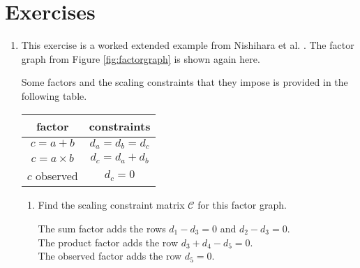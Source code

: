 

\section{Exercises}

\begin{enumerate}

\item
This exercise is a worked extended example from Nishihara et al. \cite{Nishihara:2013}. The factor graph from Figure \ref{fig:factorgraph} is shown again here.

\begin{figure}[h]
\begin{center}
\end{center}
\end{figure}

Some factors and the scaling constraints that they impose is provided in the following table.

\begin{table}[h]
\centering
\begin{tabular}{|c|c|}
\hline
factor & constraints \\
\hline
$c=a+b$ & $d_a = d_b = d_c$ \\
$c = a\times b$ & $d_c= d_a + d_b$ \\
$c$ observed & $d_c=0$ \\
\hline
\end{tabular}
\end{table}

\begin{enumerate}

\item
Find the scaling constraint matrix $\mathcal{C}$ for this factor graph.

\begin{solution}
The sum factor adds the rows $d_1 - d_3 = 0$ and $d_2 - d_3 = 0$. \\
The product factor adds the row $d_3 + d_4 - d_5 = 0$. \\
The observed factor adds the row $d_5 = 0$.


\end{solution}
\end{enumerate}
\end{enumerate}
